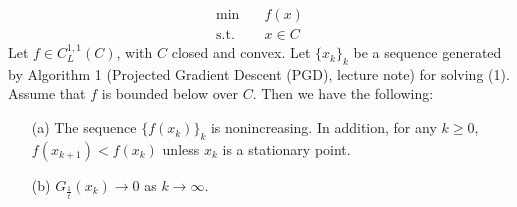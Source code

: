 \documentclass{ExerciseSheet}
\newif\ifsolutions
\begin{document}
\fi
\vskip 0.5cm
\begin{problem}
\begin{align}
\min\quad & f(x) \nonumber \\
\text{s.t.} \quad & x \in C
\end{align}
    Let $f \in C_L^{1,1}(C) $, with $C $ closed and convex. Let $\{x_k\}_k $ be a sequence generated by Algorithm 1 (Projected Gradient Descent (PGD), lecture note) for solving (1). Assume that $f $ is bounded below over $C $. Then we have the following:

\begin{itemize}
    \item[(a)] The sequence $\{f(x_k)\}_k $ is nonincreasing. In addition, for any $k \geq 0 $, $f(x_{k+1}) < f(x_k) $ unless $x_k $ is a stationary point.
    \item[(b)] $G_{\frac{1}{t}}(x_k) \to 0 $ as $k \to \infty $.
\end{itemize}
\end{problem}
\ifsolutions
\vskip 0.3cm
\end{document}
